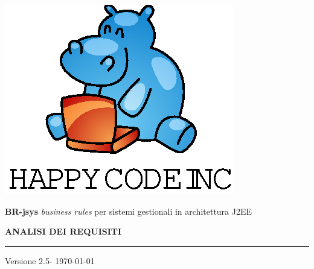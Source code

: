 \documentclass[11pt,titlepage,a4paper]{report}
\begin{document}
\newcommand{\lv}{2.5} %



\begin{titlepage}
\begin{center}
\vspace*{0.5in}
\includegraphics{logo.eps}
\vspace*{0.2in}

{\Large \textbf{BR-jsys}}
{\Large \emph{business rules} per sistemi gestionali in architettura J2EE } 
\vspace{2in}

\LARGE \textbf {ANALISI DEI REQUISITI}
\par\rule{10cm}{0.4pt} \par {\large Versione \lv - \today} %


\end{center}
\end{titlepage}
\vspace*{0.5in}
\end{document}
